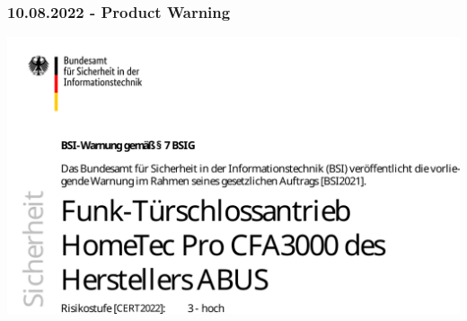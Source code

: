 \documentclass[aspectratio=169]{beamer}
\begin{document}
\begin{frame}
	\frametitle{10.08.2022 - Product Warning}

	\begin{center}
		\includegraphics[height=0.85\textheight]{BSI-Abus-Warnung.pdf}
	\end{center}
\end{frame}
\end{document}
